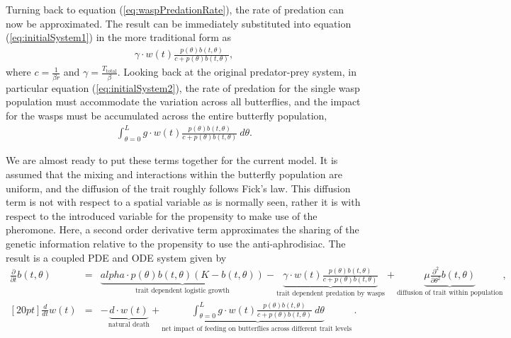 \documentclass[review,authoryear]{elsarticle}
\def\alpha{alpha}%
\newcommand{\origB}{{b}}
\newcommand{\origW}{{w}}
\newcommand{\origAlpha}{{\alpha}}
\newcommand{\origK}{{K}}
\newcommand{\origGamma}{{\gamma}}
\newcommand{\origC}{{c}}
\newcommand{\origD}{{d}}
\newcommand{\origG}{{g}}
\newcommand{\origL}{{L}}
\newcommand{\origP}[1]{{p}(#1)}
\newcommand{\origTheta}{{\theta}}
\newcommand{\origT}{{t}}
\newcommand{\origMu}{{\mu}}
\begin{document}
Turning back to equation (\ref{eq:waspPredationRate}), the rate of
predation can now be approximated.  The result can be immediately
substituted into equation (\ref{eq:initialSystem1}) in the more
traditional form as
\begin{eqnarray}
  \label{eq:butterflyPredationRate}
  \origGamma \cdot w(\origT) \frac{\origP{\origTheta} \origB(\origT,\origTheta) }{\origC +  \origP{\origTheta} \origB(\origT,\origTheta)},
\end{eqnarray}
where $\origC=\frac{1}{\beta r}$ and
$\origGamma=\frac{T_{\mathrm{total}}}{\beta}$.  Looking back at the
original predator-prey system, in particular equation
(\ref{eq:initialSystem2}), the rate of predation for the single wasp
population must accommodate the variation across all butterflies, and
the impact for the wasps must be accumulated across the entire
butterfly population,
\begin{eqnarray}
  \label{eq:totalWaspPredationRate}
  \int^{\origL}_{\origTheta=0} \origG \cdot \origW(\origT) \frac{\origP{\origTheta} \origB(\origT,\origTheta) }{\origC + \origP{\origTheta} \origB(\origT,\origTheta)} ~ d\origTheta.
\end{eqnarray}

We are almost ready to put these terms together for the current
model. It is assumed that the mixing and interactions within the
butterfly population are uniform, and the diffusion of the trait
roughly follows Fick's law\citep{logan2006applied}. This diffusion term is not with respect to a spatial variable as is normally seen, rather it is with respect to the introduced variable for the propensity to make use of the pheromone. Here, a second
order derivative term approximates the sharing of the genetic
information relative to the propensity to use the
anti-aphrodisiac. The result is a coupled PDE and ODE system given by
\begin{eqnarray}
  \label{eq:odePDE1}
  \frac{\partial}{\partial \origT} \origB(\origT,\origTheta) & = &
     \underbrace{  \origAlpha \cdot \origP{\origTheta} \origB(\origT,\origTheta) (\origK - \origB(\origT,\origTheta)) }_\text{trait dependent logistic growth}
      -  \underbrace{\origGamma \cdot \origW(\origT) \frac{\origP{\origTheta} \origB(\origT,\origTheta)}{\origC+\origP{\origTheta}\origB(\origT,\origTheta)} }_\text{trait dependent predation by wasps}
      +  \underbrace{\origMu \frac{\partial^2}{\partial \origTheta^2} \origB(\origT,\origTheta)}_\text{diffusion of trait within population}, \\ [20pt]
  \label{eq:odePDE2}
  \frac{d}{d\origT} \origW(\origT) & = & - \underbrace{ \origD \cdot \origW(\origT) }_\text{natural death}  +
        \underbrace{
          \int^{\origL}_{\origTheta=0} \origG \cdot \origW(\origT) \frac{\origP{\origTheta} \origB(\origT,\origTheta) }{\origC + \origP{\origTheta} \origB(\origT,\origTheta)} ~ d\origTheta
       }_\text{net impact of feeding on butterflies across different trait levels }.
\end{eqnarray}
\end{document}
